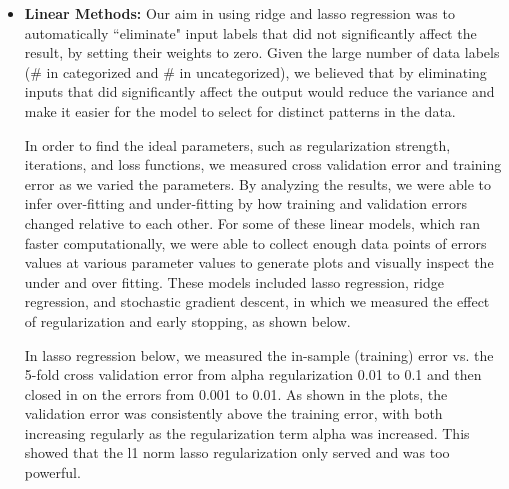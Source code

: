 \begin{itemize}
\begin{itemize}
    \item \textbf{Linear Methods:} Our aim in using ridge and lasso regression was to automatically ``eliminate" input labels that did not significantly affect the result, by setting their weights to zero. Given the large number of data labels (\# in categorized and \# in uncategorized), we believed that by eliminating inputs that did significantly affect the output would reduce the variance and make it easier for the model to select for distinct patterns in the data.
    
    \hspace{8mm} In order to find the ideal parameters, such as regularization strength, iterations, and loss functions, we measured cross validation error and training error as we varied the parameters. By analyzing the results, we were able to infer over-fitting and under-fitting by how training and validation errors changed relative to each other. For some of these linear models, which ran faster computationally, we were able to collect enough data points of errors values at various parameter values to generate plots and visually inspect the under and over fitting. These models included lasso regression, ridge regression, and stochastic gradient descent, in which we measured the effect of regularization and early stopping, as shown below.

    \hspace{8mm} In lasso regression below, we measured the in-sample (training) error vs. the 5-fold cross validation error from alpha regularization 0.01 to 0.1 and then closed in on the errors from 0.001 to 0.01. As shown in the plots, the validation error was consistently above the training error, with both increasing regularly as the regularization term alpha was increased. This showed that the l1 norm lasso regularization only served and was too powerful. 


\end{itemize}
\end{itemize}
